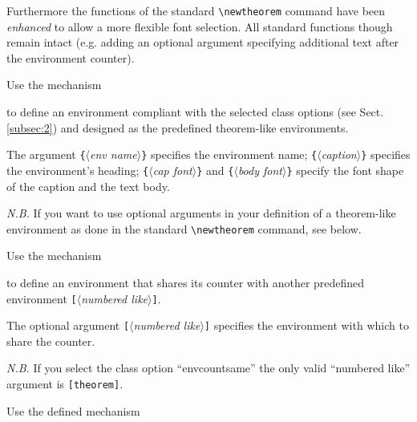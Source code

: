 \documentclass[graybox]{svmult}
\begin{document}
\begin{refguide}
\begin{sloppy}
Furthermore the functions of the standard \verb|\newtheorem| command have been
\textit{enhanced} to allow a more flexible font selection. All standard functions though
remain intact (e.g. adding an optional argument specifying additional text after
the environment counter).

Use the mechanism

\cprotect{}

to define an environment compliant with the selected class options (see Sect.\ref{subsec:2})
and designed as the predefined theorem-like environments.

The argument \verb|{|$\langle$\textit{env name}$\rangle$\verb|}| specifies the environment name; \verb|{|$\langle$\textit{caption}$\rangle$\verb|}| specifies the environment's heading; \verb|{|$\langle$\textit{cap font}$\rangle$\verb|}| and \verb|{|$\langle$\textit{body font}$\rangle$\verb|}| specify the font
shape of the caption and the text body.

\textit{N.B.} If you want to use optional arguments in your definition of a theorem-like environment as done in the standard \verb|\newtheorem| command, see below.

Use the mechanism

\cprotect{}

to define an environment that shares its counter with another predefined environment \verb|[|$\langle$\textit{numbered like}$\rangle$\verb|]|.

The optional argument \verb|[|$\langle$\textit{numbered like}$\rangle$\verb|]| specifies the environment with which
to share the counter.

\textit{N.B.} If you select the class option ``envcountsame'' the only valid ``numbered
like'' argument is \verb|[theorem]|.

Use the defined mechanism

\cprotect{}


\end{sloppy}
\end{refguide}
\end{document}

